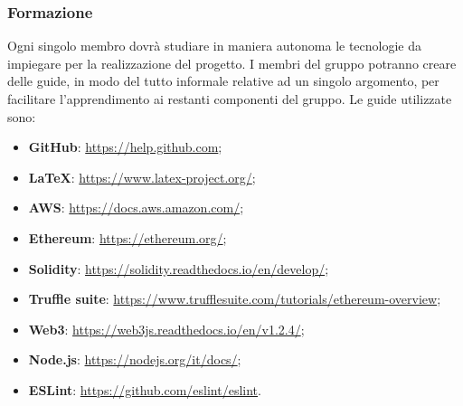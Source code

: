    		\subsubsection{Formazione}
   			Ogni singolo membro dovrà studiare in maniera autonoma le tecnologie da impiegare per la realizzazione del progetto. I membri del gruppo potranno creare delle guide, in modo del tutto informale relative ad un singolo argomento, per facilitare l'apprendimento ai restanti componenti del gruppo.
   			Le guide utilizzate sono:
   			\begin{itemize}
   				\item \textbf{GitHub}: \href{https://help.github.com}{https://help.github.com};
   				\item \textbf{\LaTeX}: \href{https://www.latex-project.org/}{https://www.latex-project.org/};
   				\item \textbf{AWS}: \href{https://docs.aws.amazon.com/}{https://docs.aws.amazon.com/};
   				\item \textbf{Ethereum\glos}: \href{https://ethereum.org/}{https://ethereum.org/};
   				\item \textbf{Solidity}: \href{https://solidity.readthedocs.io/en/develop/}{https://solidity.readthedocs.io/en/develop/};
   				\item \textbf{ Truffle suite}: \href{https://www.trufflesuite.com/tutorials/ethereum-overview}{https://www.trufflesuite.com/tutorials/ethereum-overview};
   				\item \textbf{Web3}: \href{https://web3js.readthedocs.io/en/v1.2.4/}{https://web3js.readthedocs.io/en/v1.2.4/};
   				\item \textbf{Node.js}: \href{https://nodejs.org/it/docs/}{https://nodejs.org/it/docs/};
   				\item \textbf{ESLint}: \href{https://github.com/eslint/eslint}{https://github.com/eslint/eslint}.
   			\end{itemize}
